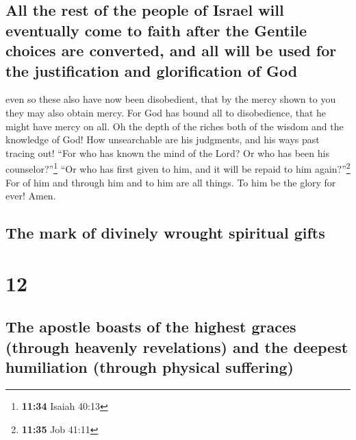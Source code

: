\hypertarget{all-the-rest-of-the-people-of-israel-will-eventually-come-to-faith-after-the-gentile-choices-are-converted-and-all-will-be-used-for-the-justification-and-glorification-of-god}{%
\subsection{All the rest of the people of Israel will eventually come to
faith after the Gentile choices are converted, and all will be used for
the justification and glorification of
God}\label{all-the-rest-of-the-people-of-israel-will-eventually-come-to-faith-after-the-gentile-choices-are-converted-and-all-will-be-used-for-the-justification-and-glorification-of-god}}

 even so these also have now been disobedient, that by
the mercy shown to you they may also obtain mercy.  For
God has bound all to disobedience, that he might have mercy on all.
 Oh the depth of the riches both of the wisdom and the
knowledge of God! How unsearchable are his judgments, and his ways past
tracing out!  ``For who has known the mind of the Lord?
Or who has been his counselor?''\footnote{\textbf{11:34} Isaiah 40:13}
 ``Or who has first given to him, and it will be repaid
to him again?''\footnote{\textbf{11:35} Job 41:11}  For
of him and through him and to him are all things. To him be the glory
for ever! Amen.

\hypertarget{the-mark-of-divinely-wrought-spiritual-gifts}{%
\subsection{The mark of divinely wrought spiritual
gifts}\label{the-mark-of-divinely-wrought-spiritual-gifts}}

\hypertarget{section-11}{%
\section{12}\label{section-11}}

\hypertarget{the-apostle-boasts-of-the-highest-graces-through-heavenly-revelations-and-the-deepest-humiliation-through-physical-suffering}{%
\subsection{The apostle boasts of the highest graces (through heavenly
revelations) and the deepest humiliation (through physical
suffering)}\label{the-apostle-boasts-of-the-highest-graces-through-heavenly-revelations-and-the-deepest-humiliation-through-physical-suffering}}

